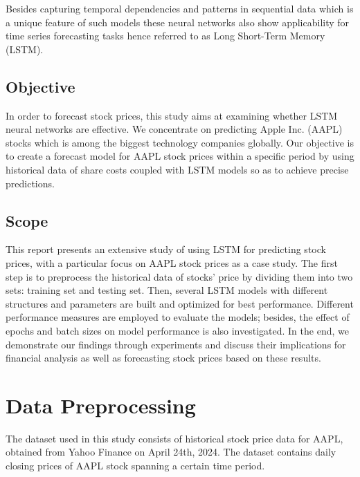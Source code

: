 \documentclass[10pt,twocolumn,letterpaper]{article}
\begin{document}
Besides capturing temporal dependencies and patterns in sequential data which 
is a unique feature of such models these neural networks also show applicability 
for time series forecasting tasks hence referred to as Long Short-Term Memory 
(LSTM). 

\subsection{Objective}
In order to forecast stock prices, this study aims at examining whether LSTM 
neural networks are effective. We concentrate on predicting Apple Inc. (AAPL) 
stocks which is among the biggest technology companies globally. Our objective
is to create  a forecast model for AAPL stock prices within a specific period by 
using historical  data of share costs coupled with LSTM models so as to achieve 
precise predictions.

\subsection{Scope}
This report presents an extensive study of using LSTM for predicting stock prices, 
with a particular focus on AAPL stock prices as a case study. The first step is to 
preprocess the historical data of stocks’ price by dividing them into two sets: 
training set and testing set. Then, several LSTM models with different structures 
and parameters are built and optimized for best performance. Different performance 
measures are employed to evaluate the models; besides, the effect of epochs and 
batch sizes on model performance is also investigated. In the end, we demonstrate 
our findings through experiments and discuss their implications for financial analysis 
as well as forecasting stock prices based on these results.


\section{Data Preprocessing}
\label{sec:data-preprocessing}
The dataset used in this study consists of historical stock price data for AAPL, 
obtained from Yahoo Finance on April 24th, 2024. The dataset contains daily 
closing prices of AAPL stock spanning a certain time period.
\end{document}
